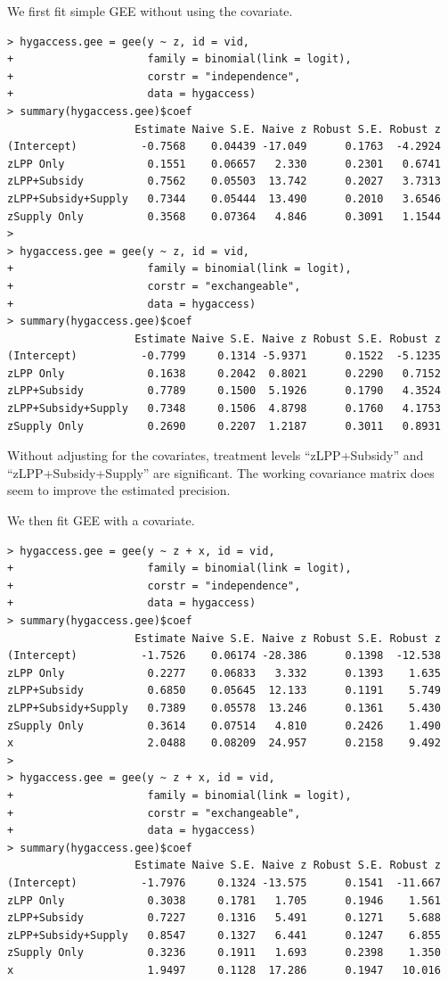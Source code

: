 We first fit simple GEE without using the covariate.
\begin{lstlisting}
> hygaccess.gee = gee(y ~ z, id = vid,
+                     family = binomial(link = logit),
+                     corstr = "independence", 
+                     data = hygaccess)
> summary(hygaccess.gee)$coef
                    Estimate Naive S.E. Naive z Robust S.E. Robust z
(Intercept)          -0.7568    0.04439 -17.049      0.1763  -4.2924
zLPP Only             0.1551    0.06657   2.330      0.2301   0.6741
zLPP+Subsidy          0.7562    0.05503  13.742      0.2027   3.7313
zLPP+Subsidy+Supply   0.7344    0.05444  13.490      0.2010   3.6546
zSupply Only          0.3568    0.07364   4.846      0.3091   1.1544
> 
> hygaccess.gee = gee(y ~ z, id = vid,
+                     family = binomial(link = logit),
+                     corstr = "exchangeable", 
+                     data = hygaccess)
> summary(hygaccess.gee)$coef
                    Estimate Naive S.E. Naive z Robust S.E. Robust z
(Intercept)          -0.7799     0.1314 -5.9371      0.1522  -5.1235
zLPP Only             0.1638     0.2042  0.8021      0.2290   0.7152
zLPP+Subsidy          0.7789     0.1500  5.1926      0.1790   4.3524
zLPP+Subsidy+Supply   0.7348     0.1506  4.8798      0.1760   4.1753
zSupply Only          0.2690     0.2207  1.2187      0.3011   0.8931
\end{lstlisting}


Without adjusting for the covariates, treatment levels ``zLPP+Subsidy'' and ``zLPP+Subsidy+Supply'' are significant. The  working covariance matrix does seem to improve the estimated precision. 


We then fit GEE with a covariate. 

\begin{lstlisting}
> hygaccess.gee = gee(y ~ z + x, id = vid,
+                     family = binomial(link = logit),
+                     corstr = "independence", 
+                     data = hygaccess)
> summary(hygaccess.gee)$coef
                    Estimate Naive S.E. Naive z Robust S.E. Robust z
(Intercept)          -1.7526    0.06174 -28.386      0.1398  -12.538
zLPP Only             0.2277    0.06833   3.332      0.1393    1.635
zLPP+Subsidy          0.6850    0.05645  12.133      0.1191    5.749
zLPP+Subsidy+Supply   0.7389    0.05578  13.246      0.1361    5.430
zSupply Only          0.3614    0.07514   4.810      0.2426    1.490
x                     2.0488    0.08209  24.957      0.2158    9.492
> 
> hygaccess.gee = gee(y ~ z + x, id = vid,
+                     family = binomial(link = logit),
+                     corstr = "exchangeable", 
+                     data = hygaccess)
> summary(hygaccess.gee)$coef
                    Estimate Naive S.E. Naive z Robust S.E. Robust z
(Intercept)          -1.7976     0.1324 -13.575      0.1541  -11.667
zLPP Only             0.3038     0.1781   1.705      0.1946    1.561
zLPP+Subsidy          0.7227     0.1316   5.491      0.1271    5.688
zLPP+Subsidy+Supply   0.8547     0.1327   6.441      0.1247    6.855
zSupply Only          0.3236     0.1911   1.693      0.2398    1.350
x                     1.9497     0.1128  17.286      0.1947   10.016
\end{lstlisting}

